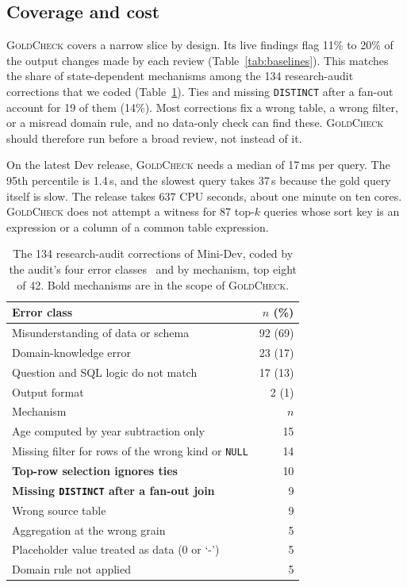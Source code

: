 \documentclass[conference]{IEEEtran}
\newcommand{\sys}{\textsc{GoldCheck}}
\begin{document}
\subsection{Coverage and cost}
\label{sec:coverage}
\sys{} covers a narrow slice by design. Its live findings flag 11\% to 20\% of
the output changes made by each review (Table~\ref{tab:baselines}). This matches
the share of state-dependent mechanisms among the 134 research-audit corrections
that we coded (Table~\ref{tab:taxonomy}). Ties and missing \texttt{DISTINCT}
after a fan-out account for 19 of them (14\%). Most corrections fix a wrong
table, a wrong filter, or a misread domain rule, and no data-only check can find
these. \sys{} should therefore run before a broad review, not instead of it.

On the latest Dev release, \sys{} needs a median of 17\,ms per query. The 95th
percentile is 1.4\,s, and the slowest query takes 37\,s because the gold query
itself is slow. The release takes 637 CPU seconds, about one minute on ten
cores. \sys{} does not attempt a witness for 87 top-$k$ queries whose sort key is
an expression or a column of a common table expression.

\begin{table}[t]
\caption{The 134 research-audit corrections of Mini-Dev, coded by the audit's
four error classes~\cite{jin2026pervasive} and by mechanism, top eight of 42.
Bold mechanisms are in the scope of \sys{}.}
\label{tab:taxonomy}
\centering
\footnotesize
\begin{tabular}{@{}lr@{}}
\toprule
Error class & $n$ (\%) \\
\midrule
Misunderstanding of data or schema & 92 (69) \\
Domain-knowledge error & 23 (17) \\
Question and SQL logic do not match & 17 (13) \\
Output format & 2 (1) \\
\midrule
Mechanism & $n$ \\
\midrule
Age computed by year subtraction only & 15 \\
Missing filter for rows of the wrong kind or \texttt{NULL} & 14 \\
\textbf{Top-row selection ignores ties} & 10 \\
\textbf{Missing \texttt{DISTINCT} after a fan-out join} & 9 \\
Wrong source table & 9 \\
Aggregation at the wrong grain & 5 \\
Placeholder value treated as data (0 or `-') & 5 \\
Domain rule not applied & 5 \\
\bottomrule
\end{tabular}
\end{table}
\end{document}

